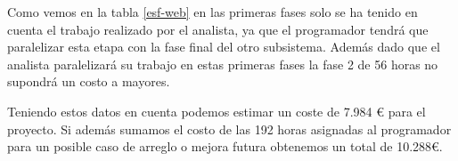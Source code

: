 Como vemos en la tabla \ref{esf-web} en las primeras fases solo se ha tenido en cuenta el trabajo realizado por el analista, ya que el programador tendrá que paralelizar esta etapa con la fase final del otro subsistema. Además dado que el analista paralelizará su trabajo en estas primeras fases la fase 2 de 56 horas no supondrá un costo a mayores.

Teniendo estos datos en cuenta podemos estimar un coste de 7.984 € para el proyecto. Si además sumamos el costo de las 192 horas asignadas al programador para un posible caso de arreglo o mejora futura obtenemos un total de 10.288€.




